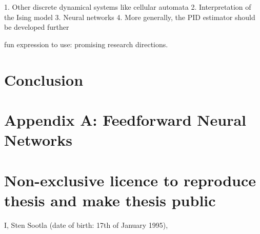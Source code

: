 \documentclass[12pt]{article}
\begin{document}
1. Other discrete dynamical systems like cellular automata
2. Interpretation of the Ising model 
3. Neural networks
4. More generally, the PID estimator should be developed further

fun expression to use: promising research directions.

\newpage
\section*{Conclusion}


\newpage



\newpage
\section*{Appendix A: Feedforward Neural Networks}


\appendix
\pagebreak
\section*{\small Non-exclusive licence to reproduce thesis and make thesis public}


I, Sten Sootla (date of birth: 17th of January 1995),
\end{document}
